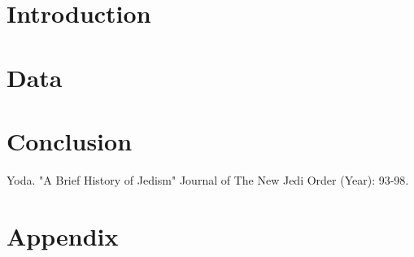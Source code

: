 \documentclass[a4paper]{article}
\begin{document}
\listoffigures
{} 


\listoftables 
{} 
\newpage


\begin{abstract}

\end{abstract}

\newpage

\section{Introduction}
\section{Data}
\section{Conclusion}

\clearpage
\begin{thebibliography}{}
 Yoda. "A Brief History of Jedism" Journal of The New Jedi Order (Year): 93-98.
 \end{thebibliography} 

\clearpage
\section*{Appendix}
\end{document}
